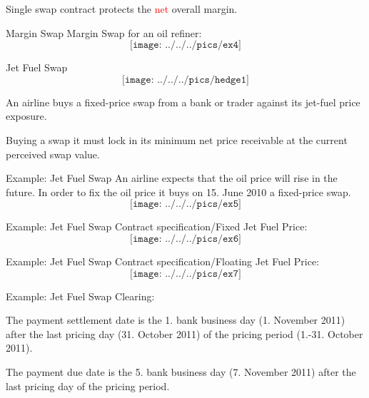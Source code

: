	Single swap contract protects the \textcolor{red}{net} overall margin.





{Margin Swap}
Margin Swap for an oil refiner:
$$\texttt{[image: ../../../pics/ex4]}$$


{Jet Fuel Swap}
\vspace{-0.4cm}
$$\texttt{[image: ../../../pics/hedge1]}$$
\vspace{-0.7cm}






	An airline buys a fixed-price swap from a bank or trader against its jet-fuel price exposure.


	Buying a swap it must lock in its minimum net price receivable at the current perceived swap value.





{Example: Jet Fuel Swap}
An airline expects that the oil price will rise in the future. In order to fix the oil price it buys on 15. June 2010 a \textcolor[rgb]{1.00,0.00,0.00}{fixed-price swap}. $$\texttt{[image: ../../../pics/ex5]}$$

{Example: Jet Fuel Swap}
Contract specification/Fixed Jet Fuel Price:\\
\vspace{0.2cm}
$$\texttt{[image: ../../../pics/ex6]}$$

{Example: Jet Fuel Swap}
Contract specification/Floating Jet Fuel Price:\\
\vspace{0.2cm}
$$\texttt{[image: ../../../pics/ex7]}$$

{Example: Jet Fuel Swap}
Clearing:






	The payment settlement date is the 1. bank business day (1. November 2011) after the last pricing day (31. October 2011) of the pricing period (1.-31. October 2011).


	The payment due date is the 5. bank business day (7. November 2011) after the last pricing day of the pricing period.


